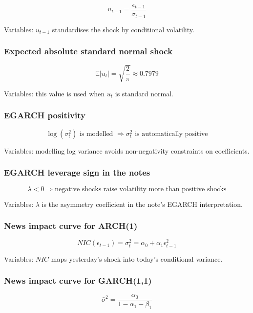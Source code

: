 \documentclass[
  8pt,
  twocolumn]{extarticle}
\begin{document}
\[
u_{t-1}=\frac{\epsilon_{t-1}}{\sigma_{t-1}}
\]

Variables: \(u_{t-1}\) standardises the shock by conditional volatility.

\subsubsection{Expected absolute standard normal
shock}\label{expected-absolute-standard-normal-shock}

\[
\mathbb E|u_t|=\sqrt{\frac{2}{\pi}}\approx0.7979
\]

Variables: this value is used when \(u_t\) is standard normal.

\subsubsection{EGARCH positivity}\label{egarch-positivity}

\[
\log(\sigma_t^2)\text{ is modelled }\Rightarrow \sigma_t^2\text{ is automatically positive}
\]

Variables: modelling log variance avoids non-negativity constraints on
coefficients.

\subsubsection{EGARCH leverage sign in the
notes}\label{egarch-leverage-sign-in-the-notes}

\[
\lambda<0\Rightarrow \text{negative shocks raise volatility more than positive shocks}
\]

Variables: \(\lambda\) is the asymmetry coefficient in the note's EGARCH
interpretation.

\subsubsection{News impact curve for
ARCH(1)}\label{news-impact-curve-for-arch1}

\[
NIC(\epsilon_{t-1})=\sigma_t^2=\alpha_0+\alpha_1\epsilon_{t-1}^2
\]

Variables: \(NIC\) maps yesterday's shock into today's conditional
variance.

\subsubsection{News impact curve for
GARCH(1,1)}\label{news-impact-curve-for-garch11}

\[
\bar\sigma^2=\frac{\alpha_0}{1-\alpha_1-\beta_1}
\]
\end{document}

